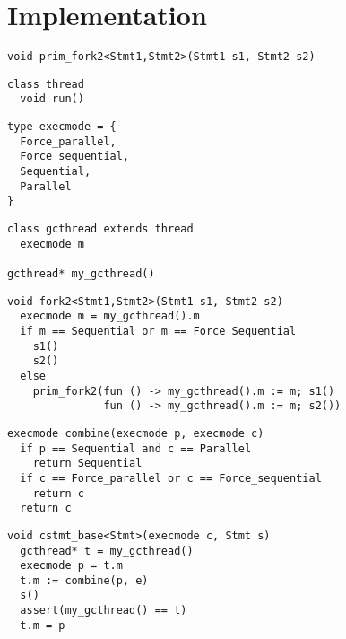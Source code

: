 \section{Implementation}

\begin{lstlisting}
void prim_fork2<Stmt1,Stmt2>(Stmt1 s1, Stmt2 s2)
\end{lstlisting}

\begin{lstlisting}
class thread
  void run()
\end{lstlisting}

\begin{lstlisting}
type execmode = {
  Force_parallel,
  Force_sequential,
  Sequential,
  Parallel
}
\end{lstlisting}

\begin{lstlisting}
class gcthread extends thread
  execmode m

gcthread* my_gcthread()
\end{lstlisting}

\begin{lstlisting}
void fork2<Stmt1,Stmt2>(Stmt1 s1, Stmt2 s2)
  execmode m = my_gcthread().m
  if m == Sequential or m == Force_Sequential
    s1()
    s2()
  else
    prim_fork2(fun () -> my_gcthread().m := m; s1()
               fun () -> my_gcthread().m := m; s2())
\end{lstlisting}

\begin{lstlisting}
execmode combine(execmode p, execmode c)
  if p == Sequential and c == Parallel
    return Sequential
  if c == Force_parallel or c == Force_sequential
    return c
  return c
\end{lstlisting}

\begin{lstlisting}
void cstmt_base<Stmt>(execmode c, Stmt s)
  gcthread* t = my_gcthread()
  execmode p = t.m
  t.m := combine(p, e)
  s()
  assert(my_gcthread() == t)
  t.m = p
\end{lstlisting}
